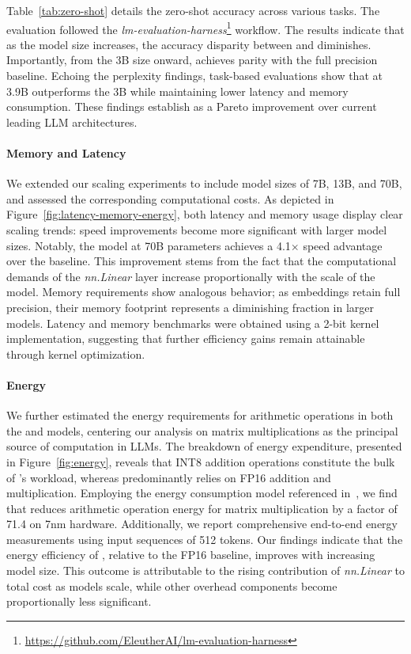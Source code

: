 Table~\ref{tab:zero-shot} details the zero-shot accuracy across various tasks. The evaluation followed the \emph{lm-evaluation-harness}\footnote{\url{https://github.com/EleutherAI/lm-evaluation-harness}} workflow. The results indicate that as the model size increases, the accuracy disparity between  and  diminishes. Importantly, from the 3B size onward,  achieves parity with the full precision baseline. Echoing the perplexity findings, task-based evaluations show that  at 3.9B outperforms the 3B  while maintaining lower latency and memory consumption. These findings establish  as a Pareto improvement over current leading LLM architectures.

\paragraph{Memory and Latency}

We extended our scaling experiments to include model sizes of 7B, 13B, and 70B, and assessed the corresponding computational costs. As depicted in Figure~\ref{fig:latency-memory-energy}, both latency and memory usage display clear scaling trends: speed improvements become more significant with larger model sizes. Notably, the  model at 70B parameters achieves a 4.1$\times$ speed advantage over the  baseline. This improvement stems from the fact that the computational demands of the \emph{nn.Linear} layer increase proportionally with the scale of the model. Memory requirements show analogous behavior; as embeddings retain full precision, their memory footprint represents a diminishing fraction in larger models. Latency and memory benchmarks were obtained using a 2-bit kernel implementation, suggesting that further efficiency gains remain attainable through kernel optimization.

\paragraph{Energy}

We further estimated the energy requirements for arithmetic operations in both the  and  models, centering our analysis on matrix multiplications as the principal source of computation in LLMs. The breakdown of energy expenditure, presented in Figure~\ref{fig:energy}, reveals that INT8 addition operations constitute the bulk of 's workload, whereas  predominantly relies on FP16 addition and multiplication. Employing the energy consumption model referenced in~\cite{energycost, pokebnn}, we find that  reduces arithmetic operation energy for matrix multiplication by a factor of 71.4 on 7nm hardware. Additionally, we report comprehensive end-to-end energy measurements using input sequences of 512 tokens. Our findings indicate that the energy efficiency of , relative to the FP16  baseline, improves with increasing model size. This outcome is attributable to the rising contribution of \emph{nn.Linear} to total cost as models scale, while other overhead components become proportionally less significant.

